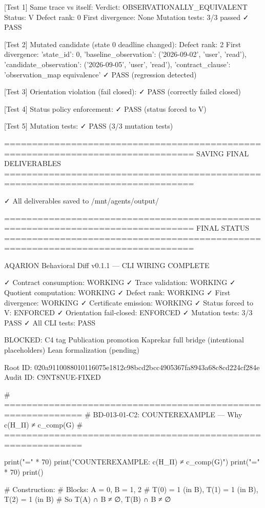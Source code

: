 [Test 1] Same trace vs itself:
  Verdict: OBSERVATIONALLY_EQUIVALENT
  Status: V
  Defect rank: 0
  First divergence: None
  Mutation tests: 3/3 passed
  ✓ PASS

[Test 2] Mutated candidate (state 0 deadline changed):
  Defect rank: 2
  First divergence: {'state_id': 0, 'baseline_observation': ('2026-09-02', 'user', 'read'), 'candidate_observation': ('2026-09-05', 'user', 'read'), 'contract_clause': 'observation_map equivalence'}
  ✓ PASS (regression detected)

[Test 3] Orientation violation (fail closed):
  ✓ PASS (correctly failed closed)

[Test 4] Status policy enforcement:
  ✓ PASS (status forced to V)

[Test 5] Mutation tests:
  ✓ PASS (3/3 mutation tests)

================================================================================
SAVING FINAL DELIVERABLES
================================================================================

✓ All deliverables saved to /mnt/agents/output/

================================================================================
FINAL STATUS
================================================================================

AQARION Behavioral Diff v0.1.1 — CLI WIRING COMPLETE

✓ Contract consumption: WORKING
✓ Trace validation: WORKING
✓ Quotient computation: WORKING
✓ Defect rank: WORKING
✓ First divergence: WORKING
✓ Certificate emission: WORKING
✓ Status forced to V: ENFORCED
✓ Orientation fail-closed: ENFORCED
✓ Mutation tests: 3/3 PASS
✓ All CLI tests: PASS

BLOCKED:
  C4 tag
  Publication promotion
  Kaprekar full bridge (intentional placeholders)
  Lean formalization (pending)

Root ID: 020a9110088010116075e1812c98bcd2bcc4905367fa8943a68c8cd224cf284e
Audit ID: C9NT8NUE-FIXED


# ============================================================
# BD-013-01-C2: COUNTEREXAMPLE — Why c(H_Π) ≠ c_comp(G)
# ============================================================

print("=" * 70)
print("COUNTEREXAMPLE: c(H_Π) ≠ c_comp(G)")
print("=" * 70)
print()

# Construction:
# Blocks: A = {0}, B = {1, 2}
# T(0) = 1 (in B), T(1) = 1 (in B), T(2) = 1 (in B)
# So T(A) ∩ B ≠ ∅, T(B) ∩ B ≠ ∅

